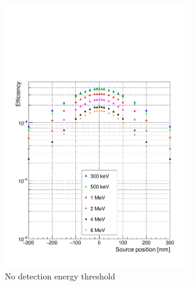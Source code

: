 \begin{figure} [!hbtp]	
\centering
\begin{subfigure}[t]{.49\textwidth}
\includegraphics[width=0.9\textwidth]{03_GraphicFiles/chapter4_HTsimu/new/EffVSpos_noCut_simple.pdf}
\caption{No detection energy threshold}
\label{chap4::fig::efficiency_noSel}
\end{subfigure}
\begin{subfigure}[t]{.49\textwidth}

\end{subfigure}
\end{figure}
